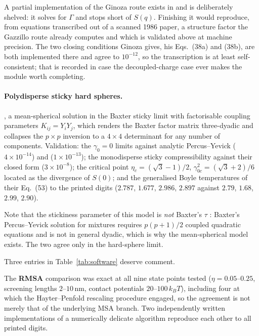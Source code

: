 A partial implementation of the Ginoza route exists in
 and is deliberately shelved: it solves for
$\Gamma$ and stops short of $S(q)$. Finishing it would reproduce, from
equations transcribed out of a scanned 1986 paper, a structure factor the
Gazzillo route already computes and which is validated above at machine
precision. The two closing conditions Ginoza gives, his Eqs.~(38a) and
(38b), are both implemented there and agree to $10^{-12}$, so the
transcription is at least self-consistent; that is recorded in case the
decoupled-charge case ever makes the module worth completing.

\paragraph{Polydisperse sticky hard spheres.}
\citet{GazzilloGiacometti2000}, a mean-spherical solution in the Baxter sticky
limit with factorisable coupling parameters $K_{ij}=Y_iY_j$, which renders
the Baxter factor matrix three-dyadic and collapses the $p\times p$ inversion
to a $4\times4$ determinant for any number of components. Validation:
the $\gamma_0=0$ limits against analytic Percus--Yevick ($4\times10^{-14}$)
and  ($1\times10^{-13}$); the monodisperse sticky
compressibility against their closed form ($3\times10^{-8}$); the critical
point $\eta_c=(\sqrt3-1)/2$, $\gamma_{0c}^2=(\sqrt3+2)/6$ located as the
divergence of $S(0)$; and the generalised Boyle temperatures of their
Eq.~(53) to the printed digits ($2.787$, $1.677$, $2.986$, $2.897$ against
$2.79$, $1.68$, $2.99$, $2.90$).

Note that the stickiness parameter of this model is \emph{not} Baxter's
$\tau$ \citep{Baxter1968}: Baxter's Percus--Yevick solution for mixtures requires $p(p+1)/2$
coupled quadratic equations and is not in general dyadic, which is why the
mean-spherical model exists. The two agree only in the hard-sphere limit.

Three entries in Table~\ref{tab:software} deserve comment.

The \textbf{RMSA} comparison was exact at all nine state points tested
($\eta = 0.05$--$0.25$, screening lengths $2$--$10$\,nm, contact potentials
$20$--$100\,k_BT$), including four at which the Hayter--Penfold rescaling
\citep{HayterPenfold1981}
procedure engaged, so the agreement is not merely that of the underlying MSA
branch. Two independently written implementations of a numerically delicate
algorithm reproduce each other to all printed digits.

